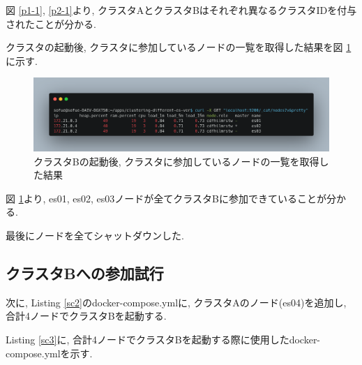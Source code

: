 \documentclass[a4j,12pt,]{jarticle}
\begin{document}
図 \ref{p1-1}, \ref{p2-1}より, クラスタAとクラスタBはそれぞれ異なるクラスタIDを付与されたことが分かる.

クラスタの起動後, クラスタに参加しているノードの一覧を取得した結果を図 \ref{p2-2}に示す.

\begin{figure}[H]
  \begin{center}
    \includegraphics[width=160mm]{3nodes-list.png}
    \caption{クラスタBの起動後, クラスタに参加しているノードの一覧を取得した結果}
    \label{p2-2}
  \end{center}
\end{figure}

図 \ref{p2-2}より, es01, es02, es03ノードが全てクラスタBに参加できていることが分かる.

最後にノードを全てシャットダウンした.

\subsection{クラスタBへの参加試行}

次に, Listing \ref{sc2}のdocker-compose.ymlに, クラスタAのノード(es04)を追加し, 合計4ノードでクラスタBを起動する.

Listing \ref{sc3}に, 合計4ノードでクラスタBを起動する際に使用したdocker-compose.ymlを示す.

\end{document}
